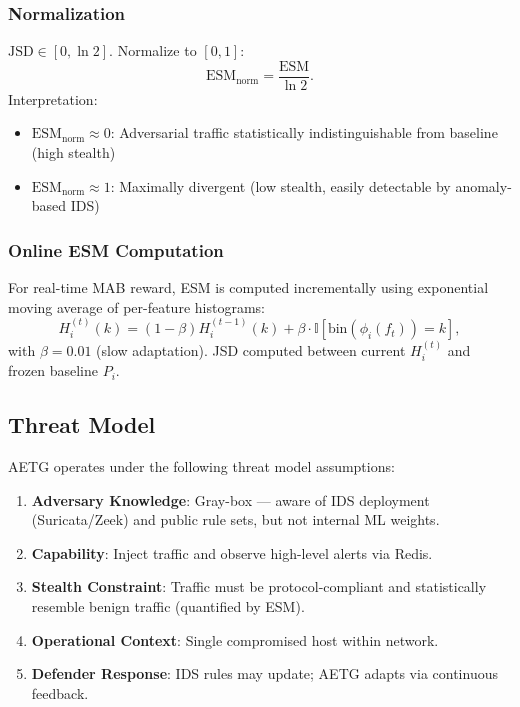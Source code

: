 \documentclass[review]{elsarticle}
\begin{document}
\subsubsection{Normalization}
$\text{JSD} \in [0, \ln 2]$. Normalize to $[0, 1]$:
\[
\text{ESM}_{\text{norm}} = \frac{\text{ESM}}{\ln 2}.
\]
Interpretation:
\begin{itemize}
\item $\text{ESM}_{\text{norm}} \approx 0$: Adversarial traffic statistically indistinguishable from baseline (high stealth)
\item $\text{ESM}_{\text{norm}} \approx 1$: Maximally divergent (low stealth, easily detectable by anomaly-based IDS)
\end{itemize}

\subsubsection{Online ESM Computation}
For real-time MAB reward, ESM is computed incrementally using exponential moving average of per-feature histograms:
\[
H_i^{(t)}(k) = (1 - \beta) H_i^{(t-1)}(k) + \beta \cdot \mathbb{I}[\text{bin}(\phi_i(f_t)) = k],
\]
with $\beta = 0.01$ (slow adaptation). JSD computed between current $H_i^{(t)}$ and frozen baseline $P_i$.

\subsection{Threat Model}
AETG operates under the following threat model assumptions:
\begin{enumerate}
\item \textbf{Adversary Knowledge}: Gray-box — aware of IDS deployment (Suricata/Zeek) and public rule sets, but not internal ML weights.
\item \textbf{Capability}: Inject traffic and observe high-level alerts via Redis.
\item \textbf{Stealth Constraint}: Traffic must be protocol-compliant and statistically resemble benign traffic (quantified by ESM).
\item \textbf{Operational Context}: Single compromised host within network.
\item \textbf{Defender Response}: IDS rules may update; AETG adapts via continuous feedback.
\end{enumerate}
\end{document}
